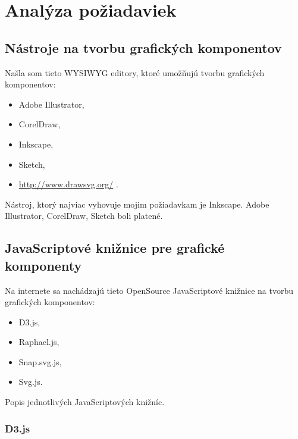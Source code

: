 \chapter{Analýza požiadaviek}

\section{Nástroje na tvorbu grafických komponentov}

Našla som tieto \acs{WYSIWYG} editory, ktoré umožňujú tvorbu grafických komponentov: 

\begin{itemize}
\item Adobe Illustrator, 
\item CorelDraw, 
\item Inkscape,
\item Sketch, 
\item \url{http://www.drawsvg.org/} .
\end{itemize}

Nástroj, ktorý najviac vyhovuje mojim požiadavkam je Inkscape. 
Adobe Illustrator, CorelDraw, Sketch boli platené. 



\section{JavaScriptové knižnice pre grafické komponenty}
Na internete sa nachádzajú tieto OpenSource JavaScriptové knižnice na tvorbu grafických komponentov: 
\begin{itemize}
	\item \acs{D3}.js, 
	\item Raphael.js, 
	\item Snap.svg.js,  
	\item Svg.js. 
\end{itemize}



Popis jednotlivých JavaScriptových knižníc.



\subsection{D3.js}

